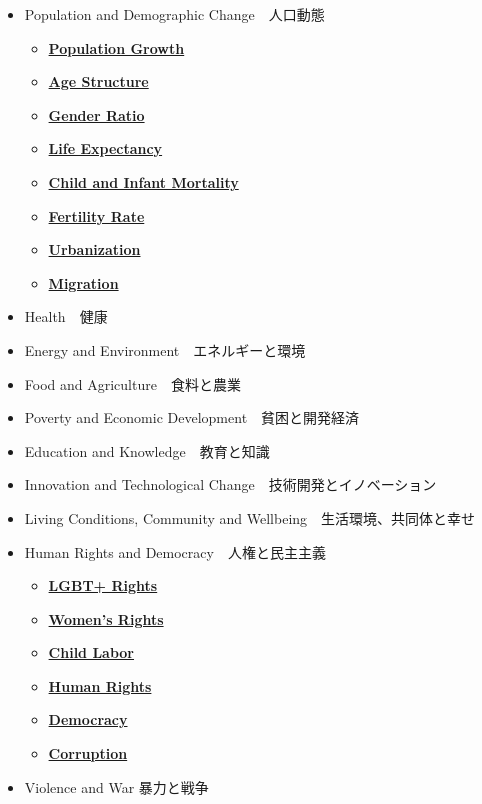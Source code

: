 \documentclass[
  xelatex, ja=standard]{bxjsbook}
\theoremstyle{definition}
\theoremstyle{definition}
\theoremstyle{definition}
\theoremstyle{definition}
\theoremstyle{remark}
\begin{document}
\begin{itemize}
\item
  Population and Demographic Change　人口動態

  \begin{itemize}
  \item
    \href{https://ourworldindata.org/population-growth}{\textbf{Population Growth}}
  \item
    \href{https://ourworldindata.org/age-structure}{\textbf{Age Structure}}
  \item
    \href{https://ourworldindata.org/gender-ratio}{\textbf{Gender Ratio}}
  \item
    \href{https://ourworldindata.org/life-expectancy}{\textbf{Life Expectancy}}
  \item
    \href{https://ourworldindata.org/child-mortality}{\textbf{Child and Infant Mortality}}
  \item
    \href{https://ourworldindata.org/fertility-rate}{\textbf{Fertility Rate}}
  \item
    \href{https://ourworldindata.org/urbanization}{\textbf{Urbanization}}
  \item
    \href{https://ourworldindata.org/migration}{\textbf{Migration}}
  \end{itemize}
\item
  Health　健康
\item
  Energy and Environment　エネルギーと環境
\item
  Food and Agriculture　食料と農業
\item
  Poverty and Economic Development　貧困と開発経済
\item
  Education and Knowledge　教育と知識
\item
  Innovation and Technological Change　技術開発とイノベーション
\item
  Living Conditions, Community and Wellbeing　生活環境、共同体と幸せ
\item
  Human Rights and Democracy　人権と民主主義

  \begin{itemize}
  \item
    \href{https://ourworldindata.org/lgbt-rights}{\textbf{LGBT+ Rights}}
  \item
    \href{https://ourworldindata.org/women-rights}{\textbf{Women's Rights}}
  \item
    \href{https://ourworldindata.org/child-labor}{\textbf{Child Labor}}
  \item
    \href{https://ourworldindata.org/human-rights}{\textbf{Human Rights}}
  \item
    \href{https://ourworldindata.org/democracy}{\textbf{Democracy}}
  \item
    \href{https://ourworldindata.org/corruption}{\textbf{Corruption}}
  \end{itemize}
\item
  Violence and War 暴力と戦争


\end{itemize}
\end{document}
